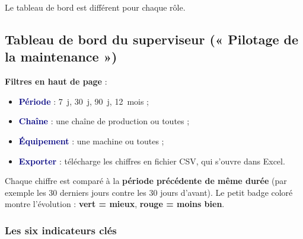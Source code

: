 \documentclass[11pt,a4paper]{article}
\newcommand{\ui}[1]{\textbf{\textcolor{navy}{#1}}}          %
\begin{document}
Le tableau de bord est différent pour chaque rôle.

\subsection{Tableau de bord du superviseur (« Pilotage de la maintenance »)}

\textbf{Filtres en haut de page} :
\begin{itemize}
  \item \ui{Période} : 7~j, 30~j, 90~j, 12~mois ;
  \item \ui{Chaîne} : une chaîne de production ou toutes ;
  \item \ui{Équipement} : une machine ou toutes ;
  \item \ui{Exporter} : télécharge les chiffres en fichier CSV, qui s'ouvre dans Excel.
\end{itemize}

Chaque chiffre est comparé à la \textbf{période précédente de même durée} (par exemple les 30 derniers jours contre les 30 jours d'avant). Le petit badge coloré montre l'évolution : \textcolor{okgreen}{\textbf{vert = mieux}}, \textcolor{badred}{\textbf{rouge = moins bien}}.

\subsubsection{Les six indicateurs clés}
\end{document}
